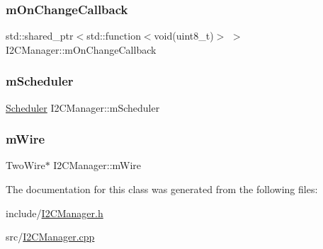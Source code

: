 \mbox{\label{class_i2_c_manager_a12b17989c484ad7e3c8cbf59786811a5}} 
\subsubsection{\texorpdfstring{m\+On\+Change\+Callback}{mOnChangeCallback}}
{\footnotesize\ttfamily std\+::shared\+\_\+ptr$<$std\+::function$<$void(uint8\+\_\+t)$>$ $>$ I2\+C\+Manager\+::m\+On\+Change\+Callback\hspace{0.3cm}{\ttfamily [private]}}

\mbox{\label{class_i2_c_manager_a75983e46a08ab8c2887617bf6c4a7c5c}} 
\subsubsection{\texorpdfstring{m\+Scheduler}{mScheduler}}
{\footnotesize\ttfamily \mbox{\hyperlink{class_scheduler}{Scheduler}} I2\+C\+Manager\+::m\+Scheduler\hspace{0.3cm}{\ttfamily [private]}}

\mbox{\label{class_i2_c_manager_a48ffd617c38c357bc24bc58182608276}} 
\subsubsection{\texorpdfstring{m\+Wire}{mWire}}
{\footnotesize\ttfamily Two\+Wire$\ast$ I2\+C\+Manager\+::m\+Wire\hspace{0.3cm}{\ttfamily [private]}}



The documentation for this class was generated from the following files\+:\begin{DoxyCompactItemize}
\item 
include/\mbox{\hyperlink{_i2_c_manager_8h}{I2\+C\+Manager.\+h}}\item 
src/\mbox{\hyperlink{_i2_c_manager_8cpp}{I2\+C\+Manager.\+cpp}}\end{DoxyCompactItemize}
